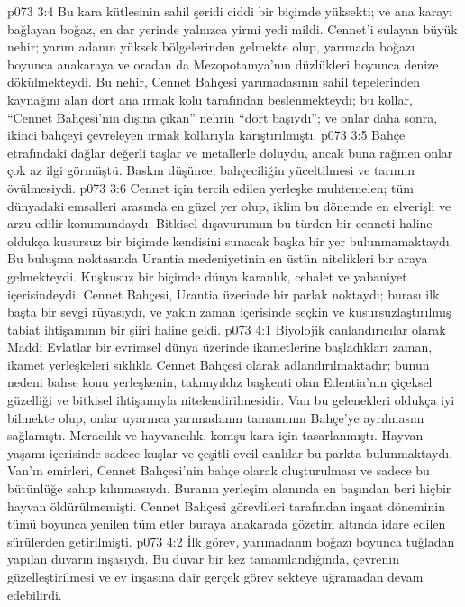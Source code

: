 \vs p073 3:4 Bu kara kütlesinin sahil şeridi ciddi bir biçimde yüksekti; ve ana karayı bağlayan boğaz, en dar yerinde yalnızca yirmi yedi mildi. Cennet’i sulayan büyük nehir; yarım adanın yüksek bölgelerinden gelmekte olup, yarımada boğazı boyunca anakaraya ve oradan da Mezopotamya’nın düzlükleri boyunca denize dökülmekteydi. Bu nehir, Cennet Bahçesi yarımadasının sahil tepelerinden kaynağını alan dört ana ırmak kolu tarafından beslenmekteydi; bu kollar, “Cennet Bahçesi’nin dışına çıkan” nehrin “dört başıydı”; ve onlar daha sonra, ikinci bahçeyi çevreleyen ırmak kollarıyla karıştırılmıştı.
\vs p073 3:5 Bahçe etrafındaki dağlar değerli taşlar ve metallerle doluydu, ancak buna rağmen onlar çok az ilgi görmüştü. Baskın düşünce, bahçeciliğin yüceltilmesi ve tarımın övülmesiydi.
\vs p073 3:6 Cennet için tercih edilen yerleşke muhtemelen; tüm dünyadaki emsalleri arasında en güzel yer olup, iklim bu dönemde en elverişli ve arzu edilir konumundaydı. Bitkisel dışavurumun bu türden bir cenneti haline oldukça kusursuz bir biçimde kendisini sunacak başka bir yer bulunmamaktaydı. Bu buluşma noktasında Urantia medeniyetinin en üstün nitelikleri bir araya gelmekteydi. Kuşkusuz bir biçimde dünya karanlık, cehalet ve yabaniyet içerisindeydi. Cennet Bahçesi, Urantia üzerinde bir parlak noktaydı; burası ilk başta bir sevgi rüyasıydı, ve yakın zaman içerisinde seçkin ve kusursuzlaştırılmış tabiat ihtişamının bir şiiri haline geldi.
\vs p073 4:1 Biyolojik canlandırıcılar olarak Maddi Evlatlar bir evrimsel dünya üzerinde ikametlerine başladıkları zaman, ikamet yerleşkeleri sıklıkla Cennet Bahçesi olarak adlandırılmaktadır; bunun nedeni bahse konu yerleşkenin, takımyıldız başkenti olan Edentia’nın çiçeksel güzelliği ve bitkisel ihtişamıyla nitelendirilmesidir. Van bu gelenekleri oldukça iyi bilmekte olup, onlar uyarınca yarımadanın tamamının Bahçe’ye ayrılmasını sağlamıştı. Meracılık ve hayvancılık, komşu kara için tasarlanmıştı. Hayvan yaşamı içerisinde sadece kuşlar ve çeşitli evcil canlılar bu parkta bulunmaktaydı. Van’ın emirleri, Cennet Bahçesi’nin bahçe olarak oluşturulması ve sadece bu bütünlüğe sahip kılınmasıydı. Buranın yerleşim alanında en başından beri hiçbir hayvan öldürülmemişti. Cennet Bahçesi görevlileri tarafından inşaat döneminin tümü boyunca yenilen tüm etler buraya anakarada gözetim altında idare edilen sürülerden getirilmişti.
\vs p073 4:2 İlk görev, yarımadanın boğazı boyunca tuğladan yapılan duvarın inşasıydı. Bu duvar bir kez tamamlandığında, çevrenin güzelleştirilmesi ve ev inşasına dair gerçek görev sekteye uğramadan devam edebilirdi.
